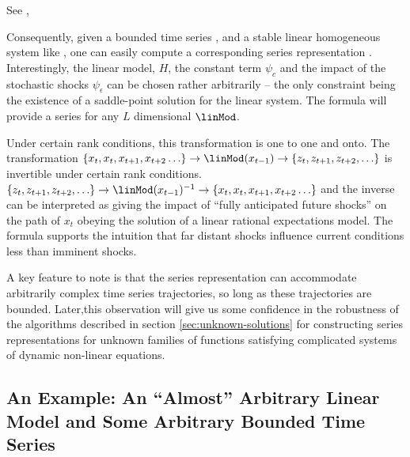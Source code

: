 \documentclass[12pt]{article}
\begin{document}
\begin{myProof}
See \citep{anderson10},
\end{myProof}

	 Consequently, given a bounded time series ,
and a stable linear homogeneous system like ,
one can easily compute a corresponding series representation 
.
Interestingly, the linear model, $H$, the  constant term $\psi_c$ and the
impact of the stochastic shocks $\psi_\epsilon $ can  be 
chosen rather arbitrarily -- the only constraint being the existence of a saddle-point solution for the linear system.  The formula will provide a series  for any $L$ dimensional $\linMod$.



Under certain rank conditions, this transformation is one to one and onto.  The
transformation $ {\{ x_{t}, x_{t}, x_{t+1},x_{t+2}\ldots\}} \rightarrow \linMod(x_{t-1}) \rightarrow{\{ z_{t}, z_{t+1}, z_{t+2},\ldots\}} $ is invertible under
certain rank conditions. $ {\{ z_{t}, z_{t+1}, z_{t+2},\ldots\}} \rightarrow \linMod(x_{t-1})^{-1} \rightarrow{\{ x_{t}, x_{t}, x_{t+1},x_{t+2}\ldots\}} $ and the inverse can be interpreted as giving the impact of ``fully anticipated future shocks'' on the path of $x_t$ obeying the solution of a linear rational expectations model.  The formula supports the intuition that far distant shocks influence current conditions less than  imminent shocks.

A key feature to note is that the series representation can accommodate arbitrarily complex time series trajectories, so long as these trajectories are bounded.
Later,this observation will give us some confidence in the 
robustness of the algorithms described in section 
\ref{sec:unknown-solutions} for constructing series 
representations for unknown families of functions 
satisfying complicated systems of dynamic non-linear equations.

\subsection{An Example: An ``Almost'' Arbitrary Linear Model and  Some Arbitrary  Bounded Time Series}
\label{sec:almostarbitrary}
\end{document}
